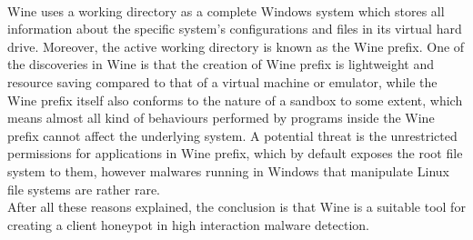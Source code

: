 \paragraph{}
Wine uses a working directory as a complete Windows system which stores all 
information about the specific system's configurations and files in its virtual 
hard drive. Moreover, the active working directory is known as the Wine prefix. 
One of the discoveries in Wine is that the creation of Wine prefix is 
lightweight and resource saving compared to that of a virtual machine or
emulator, while the Wine prefix itself also conforms to the nature of a 
sandbox to some extent, which means almost all kind of behaviours performed 
by programs inside the Wine prefix cannot affect the underlying system. 
A potential threat is the unrestricted permissions 
for applications in Wine prefix, which by default exposes the root file 
system to them, however malwares running in Windows that manipulate Linux 
file systems are rather rare. \\
After all these reasons explained, the conclusion is that Wine is a suitable 
tool for creating a client honeypot in high interaction malware detection. 

